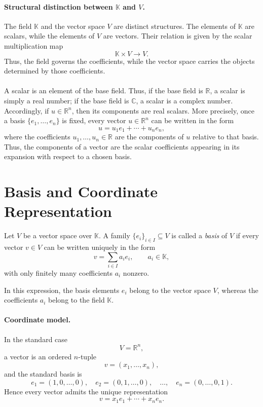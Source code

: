 \documentclass{article}
\begin{document}
\paragraph{Structural distinction between $\mathbb{K}$ and $V$.}
The field $\mathbb{K}$ and the vector space $V$ are distinct structures. The elements of $\mathbb{K}$ are scalars, while the elements of $V$ are vectors. Their relation is given by the scalar multiplication map
$$
\mathbb{K}\times V\to V.
$$
Thus, the field governs the coefficients, while the vector space carries the objects determined by those coefficients.

\paragraph{}
A scalar is an element of the base field. Thus, if the base field is $\mathbb{R}$, a scalar is simply a real number; if the base field is $\mathbb{C}$, a scalar is a complex number. Accordingly, if $u\in \mathbb{R}^n$, then its components are real scalars. More precisely, once a basis $\{e_1,\dots,e_n\}$ is fixed, every vector $u\in \mathbb{R}^n$ can be written in the form
$$
u=u_1e_1+\cdots+u_ne_n,
$$
where the coefficients $u_1,\dots,u_n\in\mathbb{R}$ are the components of $u$ relative to that basis. Thus, the components of a vector are the scalar coefficients appearing in its expansion with respect to a chosen basis.

\section{Basis and Coordinate Representation}

\begin{definition}[Basis]
Let $V$ be a vector space over $\mathbb{K}$. A family $\{e_i\}_{i\in I}\subseteq V$ is called a \emph{basis} of $V$ if every vector $v\in V$ can be written uniquely in the form
$$
v=\sum_{i\in I} a_i e_i,
\qquad
 a_i\in\mathbb{K},
$$
with only finitely many coefficients $a_i$ nonzero.
\end{definition}

In this expression, the basis elements $e_i$ belong to the vector space $V$, whereas the coefficients $a_i$ belong to the field $\mathbb{K}$.

\paragraph{Coordinate model.}
In the standard case
$$
V=\mathbb{R}^n,
$$
a vector is an ordered $n$-tuple
$$
v=(x_1,\dots,x_n),
$$
and the standard basis is
$$
e_1=(1,0,\dots,0),\quad
e_2=(0,1,\dots,0),\quad \dots,\quad
e_n=(0,\dots,0,1).
$$
Hence every vector admits the unique representation
$$
v=x_1e_1+\cdots+x_ne_n.
$$
\end{document}

